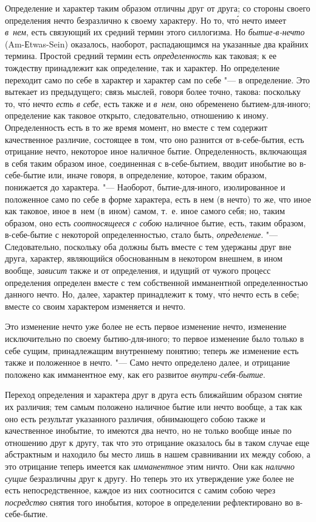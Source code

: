 Определение и характер таким образом отличны друг от друга; со стороны
своего определения нечто безразлично к своему характеру. Но то, чт\'{о} нечто
имеет {\em в~нем}, есть связующий их средний термин
этого силлогизма. Но {\em бытие-в-нечто}
(Am-Еtwas-Sein) оказалось, наоборот, распадающимся на указанные два крайних
термина. Простой средний термин есть
{\em определенность} как таковая; к ее тождеству
принадлежит как определение, так и характер. Но определение переходит само
по себе в характер и характер сам по себе "--- в определение. Это вытекает из
предыдущего; связь мыслей, говоря более точно, такова: поскольку то, чт\'{о}
нечто {\em есть в себе}, есть также и
{\em в~нем}, оно обременено бытием-для-иного;
определение как таковое открыто, следовательно, отношению к иному.
Определенность есть в то же время момент, но вместе с тем содержит
качественное различие, состоящее в том, что оно разнится от в-себе-бытия,
есть отрицание нечто, некоторое иное наличное бытие. Определенность,
включающая в себя таким образом иное, соединенная с в-себе-бытием, вводит
инобытие во в-себе-бытие или, иначе говоря, в определение, которое, таким
образом, понижается до характера. "--- Наоборот, бытие-для-иного,
изолированное и положенное само по себе в форме характера, есть в нем (в
нечто) то же, что иное как таковое, иное в~нем (в~ином) самом, т.~е.
иное самого себя; но, таким образом, оно есть
{\em соотносящееся с собою} наличное бытие, есть, таким
образом, в-себе-бытие с некоторой определенностью, стало быть,
{\em определение}. "--- Следовательно, поскольку оба
должны быть вместе с тем удержаны друг вне друга, характер, являющийся
обоснованным в некотором внешнем, в ином вообще,
{\em зависит} также и от определения, и идущий от
чужого процесс определения определен вместе с тем собственной имманентной
определенностью данного нечто. Но, далее, характер принадлежит к тому, чт\'{о}
нечто есть в себе; вместе со своим характером изменяется и нечто.

Это изменение нечто уже более не есть первое изменение нечто, изменение
исключительно по своему бытию-для-иного; то первое изменение было только
в себе сущим, принадлежащим внутреннему понятию; теперь же изменение есть
также и положенное в нечто. "--- Само нечто определено далее, и отрицание
положено как имманентное ему, как его развитое
{\em внутри-себя-бытие}.

Переход определения и характера друг в друга есть ближайшим образом снятие
их различия; тем самым положено наличное бытие или нечто вообще, а так как
оно есть результат указанного различия, обнимающего собою также и
качественное инобытие, то имеются два нечто, но не только вообще иные по
отношению друг к другу, так что это отрицание оказалось бы в таком случае
еще абстрактным и находило бы место лишь в нашем сравнивании их между
собою, а это отрицание теперь имеется как
{\em имманентное} этим ничто. Они как
{\em налично сущие} безразличны друг к другу. Но теперь
это их утверждение уже более не есть непосредственное, каждое из них
соотносится с самим собою через {\em посредство} снятия
того инобытия, которое в определении рефлектировано во в-себе-бытие.

